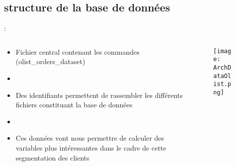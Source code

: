 \documentclass[8pt,aspectratio=169,hyperref={unicode=true}]{beamer}
\begin{document}
\subsection{structure de la base de données}
\begin{frame}{\insertsection: \insertsubsection}
    \begin{columns}
        \begin{column}{.4\textwidth}
            \begin{itemize}
                \item Fichier central contenant les commandes (olist\_orders\_dataset)
                \item[]
                \item Des identifiants permettent de rassembler les différents fichiers constituant la base de données
                \item[]
                \item Ces données vont nous permettre de calculer des variables plus intéressantes dans le cadre de cette segmentation des clients
            \end{itemize}
        \end{column}
        \begin{column}{.6\textwidth}
            \begin{figure}
                \texttt{[image: ArchDataOlist.png]}
            \end{figure}
        \end{column}
    \end{columns}
\end{frame}
\end{document}
